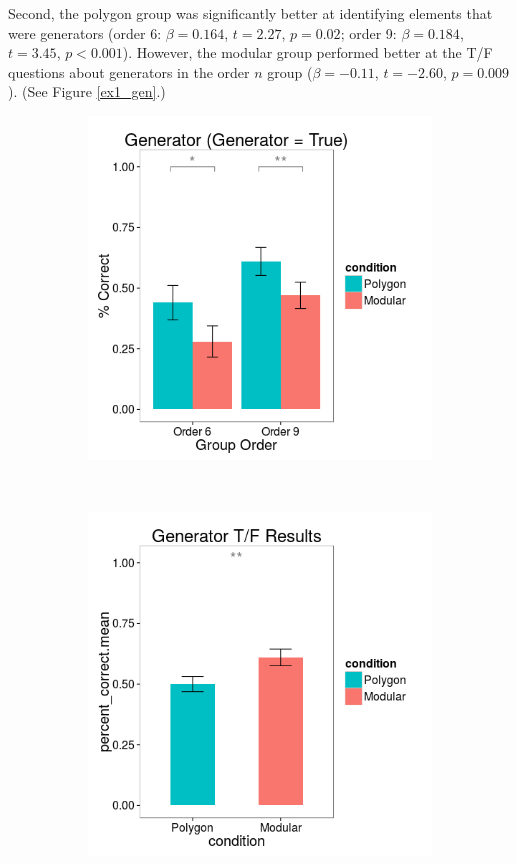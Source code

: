 \documentclass[11pt]{article}
\begin{document}
Second, the polygon group was significantly better at identifying elements that were generators (order 6: $\beta = 0.164$, $t = 2.27$, $p = 0.02$; order 9: $\beta = 0.184$, $t = 3.45$, $p < 0.001$). However, the modular group performed better at the T/F questions about generators in the order $n$ group ($\beta = -0.11$, $t = -2.60$, $p = 0.009$). (See Figure \ref{ex1_gen}.)
\begin{figure}[H]
\centering
\begin{subfigure}[c]{0.4\textwidth}
\centering
\includegraphics[width=\textwidth]{figures/1/gen_T_r.png}
\end{subfigure}
~
\begin{subfigure}[c]{0.4\textwidth}
\centering
\includegraphics[width=\textwidth]{figures/1/gen_TF_r.png}

\end{subfigure}
\end{figure}
\end{document}
